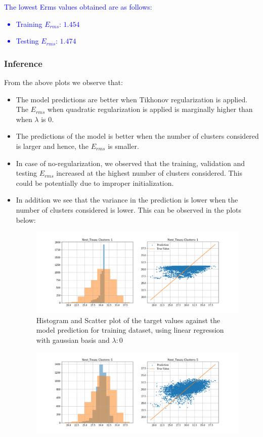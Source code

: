 \documentclass[12pt,a4paper]{article}
\newcommand{\noi}{\noindent}
\begin{document}
\textcolor{blue}{
\noi
The lowest Erms values obtained are as follows:
\begin{itemize}
    \itemsep0em
    \item Training $E_{rms}$: $1.454$
    \item Testing $E_{rms}$: $1.474$
\end{itemize}
}

\subsubsection{Inference}
From the above plots we observe that:
\begin{itemize}
    \itemsep0em
    \item The model predictions are better when Tikhonov regularization is applied. The $E_{rms}$ when quadratic regularization is applied is marginally higher than when $\lambda$ is 0.
    \item The predictions of the model is better when the number of clusters considered is larger and hence, the $E_{rms}$ is smaller.
    \item In case of no-regularization, we observed that the training, validation and testing $E_{rms}$ increased at the highest number of clusters considered. This could be potentially due to improper initialization.
    \item In addition we see that the variance in the prediction is lower when the number of clusters considered is lower. This can be observed in the plots below:
    \begin{figure}[H]
        \centering
        \includegraphics[scale=0.4]{images/t3_d3/no_reg/T_max_nclu_1.png}
        \caption{Histogram and Scatter plot of the target values against the model prediction for training dataset, using linear regression with gaussian basis and $\lambda: 0$}
    \end{figure}
    \begin{figure}[H]
        \centering
        \includegraphics[scale=0.4]{images/t3_d3/no_reg/T_max_nclu_5.png}

\end{figure}
\end{itemize}
\end{document}
